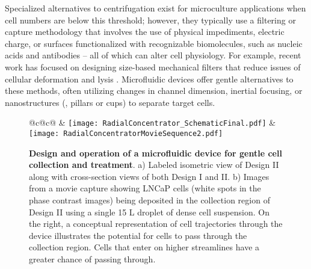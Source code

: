 Specialized alternatives to centrifugation exist for microculture applications when cell numbers are below this threshold; however, they typically use a filtering or capture methodology that involves the use of physical impediments\cite{Zheng:2007fk,Kuo:2010uq}, electric charge\cite{Gascoyne:2009kx,Sankaran:2008vn,Hsiung08}, or surfaces functionalized with recognizable biomolecules, such as nucleic acids\cite{Douglas:2009dq,Hsiao:2009zr,Xu:2009ly} and antibodies\cite{Dharmasiri:2009ys,Plouffe:2009oq,Sherman:2010cr,Russom08} -- all of which can alter cell physiology. For example, recent work has focused on designing size-based mechanical filters that reduce issues of cellular deformation and lysis \cite{Kuo:2010uq}. Microfluidic devices offer gentle alternatives to these methods, often utilizing changes in channel dimension\cite{Mohamed:2009nx,Jain:2009tg}, inertial focusing\cite{Kuntaegowdanahalli:2009kl,Di-Carlo:2008ve}, or nanostructures (\eg , pillars or cups) to separate target cells\cite{Hosokawa:2009bh,Green:2009qf}.

\begin{figure*}[!t]
\centering
\begin{tabular}{@{}c@{}c@{}}
 &  \cr
\hspace{0.5cm}\texttt{[image: RadialConcentrator\_SchematicFinal.pdf]} &
\hspace{0.5cm}\texttt{[image: RadialConcentratorMovieSequence2.pdf]}
\end{tabular}
\caption{\textbf{Design and operation of a microfluidic device for gentle cell collection and treatment}. a) Labeled isometric view of Design II along with cross-section views of both Design I and II. b) Images from a movie capture showing LNCaP cells (white spots in the phase contrast images) being deposited in the collection region of Design II using a single 15 \textmu L droplet of dense cell suspension. On the right, a conceptual representation of cell trajectories through the device illustrates the potential for cells to pass through the collection region. Cells that enter on higher streamlines have a greater chance of passing through.}
\label{fig:device}
\end{figure*}

